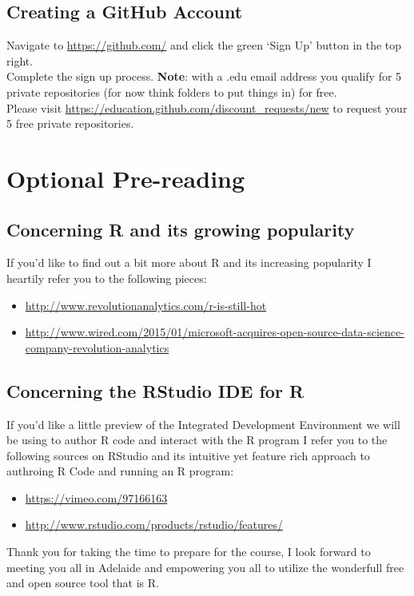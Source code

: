 \documentclass{article}[12pt]
\begin{document}
\subsection*{Creating a GitHub Account}
Navigate to \url{https://github.com/} and click the green `Sign Up' button in the top right.\\
Complete the sign up process.
\newline
\newline
\textbf{Note}: with a .edu email address you qualify for 5 private repositories (for now think folders to put things in) for free.\\
Please visit \url{https://education.github.com/discount_requests/new} to request your 5 free private repositories.

\section*{Optional Pre-reading}
\subsection*{Concerning R and its growing popularity}
If you'd like to find out a bit more about R and its increasing popularity I heartily refer you to the following pieces: \begin{itemize}
\item \url{http://www.revolutionanalytics.com/r-is-still-hot}
\item \href{http://www.wired.com/2015/01/microsoft-acquires-open-source-data-science-company-revolution-analytics}{http://www.wired.com/2015/01/microsoft-acquires-open-source-data-science-company-revolution-analytics}
\end{itemize}

\subsection*{Concerning the RStudio IDE for R}
If you'd like a little preview of the Integrated Development Environment we will be using to author R code and interact with the R program I refer you to the following sources on RStudio and its intuitive yet feature rich approach to authroing R Code and running an R program: \begin{itemize}
\item \url{https://vimeo.com/97166163}
\item \url{http://www.rstudio.com/products/rstudio/features/}
\newline
\end{itemize}

Thank you for taking the time to prepare for the course, I look forward to meeting you all in Adelaide and empowering you all to utilize the wonderfull free and open source tool that is R.
\end{document}
